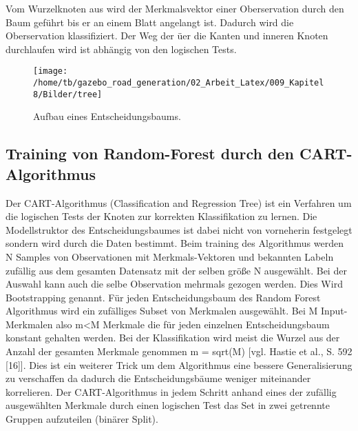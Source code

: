 Vom Wurzelknoten aus wird der Merkmalsvektor einer Oberservation durch den Baum gef{\"u}hrt bis er an einem Blatt angelangt ist. Dadurch wird die Oberservation klassifiziert.
Der Weg der {\"u}er die Kanten und inneren Knoten durchlaufen wird ist abh{\"a}ngig von den logischen Tests.



\begin{figure}[H]
\begin{center}
  \texttt{[image: /home/tb/gazebo\_road\_generation/02\_Arbeit\_Latex/009\_Kapitel8/Bilder/tree]}%
  \caption[Aufbau eines Entscheidungsbaums]%
           {\label{fig:Aufbau eines Entscheidungsbaums}%
           Aufbau eines Entscheidungsbaums.
           }
\end{center}
\end{figure}

\subsection{Training von Random-Forest durch den CART-Algorithmus}
\label{subsec:Training von Random-Forest durch den CART-Algorithmus}

Der CART-Algorithmus (Classification and Regression Tree) ist ein Verfahren um die logischen Tests der Knoten zur korrekten Klassifikation zu lernen. Die Modellstruktor des Entscheidungsbaumes ist dabei nicht von vorneherin festgelegt sondern wird durch die Daten bestimmt. 
Beim training des Algorithmus werden N Samples von Observationen mit Merkmals-Vektoren und bekannten Labeln zuf{\"a}llig aus dem gesamten Datensatz mit der selben gr{\"o}{\ss}e N  ausgew{\"a}hlt. Bei der Auswahl kann auch die selbe Observation mehrmals gezogen werden. Dies Wird  Bootstrapping genannt. 
F{\"u}r jeden Entscheidungsbaum des Random Forest Algorithmus wird ein zuf{\"a}lliges Subset von Merkmalen ausgew{\"a}hlt. Bei M Input-Merkmalen also m<M Merkmale die f{\"u}r jeden einzelnen Entscheidungsbaum konstant gehalten werden. Bei der Klassifikation wird meist die Wurzel aus der Anzahl der gesamten Merkmale genommen m = sqrt(M) [vgl. Hastie et al., S. 592 [16]]. Dies ist ein weiterer Trick um dem Algorithmus eine bessere Generalisierung zu verschaffen da dadurch die Entscheidungsb{\"a}ume weniger miteinander korrelieren.
Der CART-Algorithmus in jedem Schritt anhand eines der zuf{\"a}llig ausgew{\"a}hlten Merkmale durch einen logischen Test das Set in zwei getrennte Gruppen aufzuteilen (bin{\"a}rer Split).

